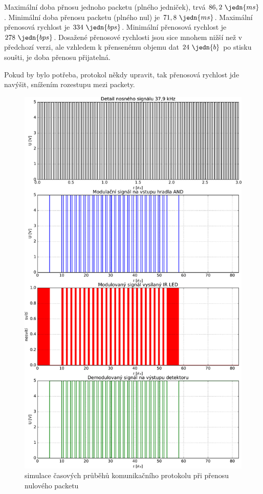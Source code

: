 Maximální doba přnosu jednoho packetu (plného jedniček), trvá $86,2~\jedn{ms}$. Minimální doba přenosu packetu (plného nul) je $71,8~\jedn{ms}$. Maximální přenosová rychlost je $334~\jedn{bps}$. Minimální přenosová rychlost je $278~\jedn{bps}$. Dosažené přenosové rychlosti jsou sice mnohem nižší než v předchozí verzi, ale vzhledem k přensenému objemu dat $24~\jedn{b}$ po stisku soušti, je doba přenosu přijatelná.

Pokud by bylo potřeba, protokol někdy upravit, tak přenosová rychlost jde navýšit, snížením rozestupu mezi packety.


\begin{figure}[H]
    \begin{center}
        \includegraphics[height=0.97\textheight]{img/model-ir-komunikace}
    \end{center}
    \caption{simulace časových průběhů komunikačního protokolu při přenosu nulového packetu}
\end{figure}
